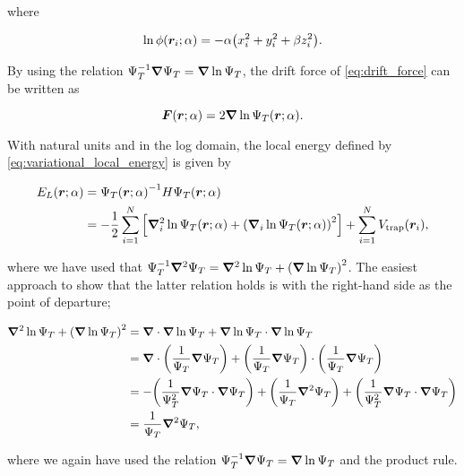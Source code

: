 where 

\begin{equation*}
    \ln \phi \qty(\bm{r}_i; \alpha) = -\alpha \qty(x_i^2 + y_i^2 + \beta z_i^2).
\end{equation*}

By using the relation $\Psi_T^{-1} \grad \Psi_T = \grad \ln \Psi_T$, the drift force of \autoref{eq:drift_force} can be written as 

\begin{equation}\label{eq:log_drift_force}
    \bm{F} \qty(\bm{r}; \alpha) = 2 \grad \ln \Psi_T \qty(\bm{r}; \alpha).
\end{equation}

With natural units and in the log domain, the local energy defined by \autoref{eq:variational_local_energy} is given by

\begin{equation}\label{eq:local_energy}
\begin{aligned}
    E_L \qty(\bm{r}; \alpha) &= \Psi_T \qty(\bm{r}; \alpha)^{-1} H \Psi_T \qty(\bm{r}; \alpha) \\
    &= - \frac{1}{2} \sum_{i=1}^N \qty[\grad_i^2 \ln \Psi_T \qty(\bm{r}; \alpha) + \qty(\grad_i \ln \Psi_T \qty(\bm{r}; \alpha))^2] + \sum_{i=1}^{N} V_\mathrm{trap}\qty(\bm{r}_i), 
\end{aligned}
\end{equation}

where we have used that $\Psi_T^{-1} \grad^2 \Psi_T = \grad^2 \ln \Psi_T + \qty(\grad \ln \Psi_T)^2$. The easiest approach to show that the latter relation holds is with the right-hand side as the point of departure;

\begin{align*}
    \grad^2 \ln{\Psi_T} + \qty(\grad\ln{\Psi_T})^2 &= \grad\cdot\grad\ln{\Psi_T} + \grad\ln{\Psi_T}\cdot\grad\ln{\Psi_T}
    \\
    &= \grad\cdot\qty(\frac{1}{\Psi_T}\grad\Psi_T) + \qty(\frac{1}{\Psi_T}\grad\Psi_T)\cdot\qty(\frac{1}{\Psi_T}\grad\Psi_T)
    \\
    &= -\qty(\frac{1}{\Psi_T^2}\grad\Psi_T\cdot\grad\Psi_T) + \qty(\frac{1}{\Psi_T}\grad^2\Psi_T) + \qty(\frac{1}{\Psi_T^2}\grad\Psi_T\cdot\grad\Psi_T)
    \\
    &= \frac{1}{\Psi_T}\grad^2\Psi_T,
\end{align*}

where we again have used the relation $\Psi_T^{-1} \grad \Psi_T = \grad \ln \Psi_T$ and the product rule. 

